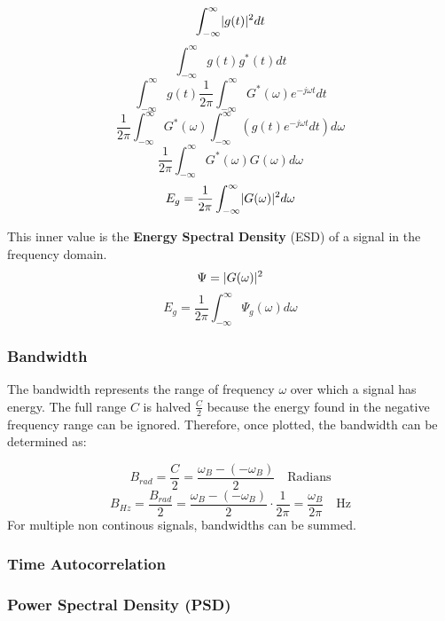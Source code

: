 \documentclass[11pt]{article}
\DeclarePairedDelimiter{\abs}{\lvert}{\rvert}
\begin{document}
$$\int^{\infty}_{-\infty}\abs{g(t)}^2dt$$
$$\int^{\infty}_{-\infty}g(t)g^*(t)dt$$
$$\int^{\infty}_{-\infty}g(t)\frac{1}{2\pi}\int^{\infty}_{-\infty}G^*(\omega)e^{-j\omega t}dt$$
$$\frac{1}{2\pi}\int^{\infty}_{-\infty}G^*(\omega)\int^{\infty}_{-\infty}(g(t)e^{-j\omega t}dt)d\omega$$
$$\frac{1}{2\pi}\int^{\infty}_{-\infty}G^*(\omega)G(\omega)d\omega$$
$$E_g = \frac{1}{2\pi}\int^{\infty}_{-\infty}\abs{G(\omega)}^2d\omega$$

This inner value is the \textbf{Energy Spectral Density} (ESD) of a signal in the frequency domain. \\ 

$$\Psi = \abs{G(\omega)}^2$$
$$E_g = \frac{1}{2\pi}\int^{\infty}_{-\infty}\Psi_g(\omega)d\omega$$

\subsubsection{Bandwidth}
The bandwidth represents the range of frequency $\omega$ over which a signal has energy. The full range $C$ is halved $\frac{C}{2}$ because the energy found in the negative frequency range can be ignored. Therefore, once plotted, the bandwidth can be determined as: 

$$B_{rad} = \frac{C}{2} = \frac{\omega_B - (-\omega_B)}{2} \quad \text{Radians}$$
$$B_{Hz} = \frac{B_{rad}}{2} = \frac{\omega_B - (-\omega_B)}{2} \cdot \frac{1}{2\pi} = \frac{\omega_B}{2\pi}\quad \text{Hz}$$
\hfill \break
For multiple non continous signals, bandwidths can be summed.

\subsubsection{Time Autocorrelation}

\subsubsection{Power Spectral Density (PSD)}
\end{document}
